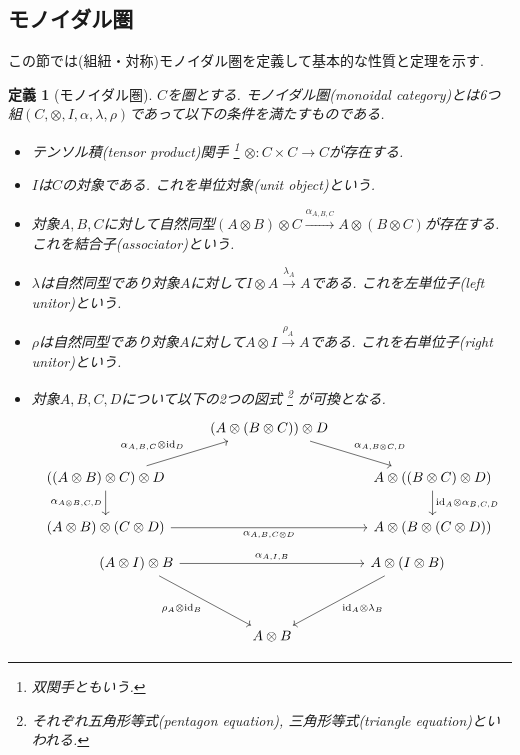 \documentclass[a4paper,12pt]{ltjsarticle}
\theoremstyle{break}
\newtheorem{defn}[thm]{定義}
\newcommand{\xr}[1]{\xrightarrow{#1}}
\newcommand{\id}{\mathrm{id}}
\newcommand{\al}{\alpha}
\newcommand{\la}{\lambda}
\newcommand{\ot}{\otimes}
\newcommand{\ti}{\times}
\numberwithin{equation}{section}
\begin{document}
\subsection{モノイダル圏}
この節では(組紐・対称)モノイダル圏を定義して基本的な性質と定理を示す. 

\begin{defn}[モノイダル圏]
  $C$を圏とする. 
  モノイダル圏(monoidal category)とは6つ組$(C,\ot, I, \al, \la, \rho)$であって以下の条件を満たすものである. 
  \begin{itemize}
    \item テンソル積(tensor product)関手
    \footnote{
    双関手ともいう. 
    }
    $\ot: C \ti C \to C$が存在する. 
    \item $I$は$C$の対象である. これを単位対象(unit object)という. 
    \item 対象$A, B, C$に対して自然同型$(A \ot B) \ot C \xr{\al_{A,B,C}} A \ot (B \ot C)$が存在する. これを結合子(associator)という. 
    \item $\la$は自然同型であり対象$A$に対して$I \ot A \xr{\la_A} A$である. これを左単位子(left unitor)という. 
    \item $\rho$は自然同型であり対象$A$に対して$A \ot I \xr{\rho_A} A$である. これを右単位子(right unitor)という. 
    \item 対象$A, B, C, D$について以下の2つの図式
      \footnote{
      それぞれ五角形等式(pentagon equation), 三角形等式(triangle equation)といわれる. 
      }
      が可換となる. 
    \[\begin{tikzcd}
      & {(A \ot (B \ot C)) \ot D} \\
      {((A \ot B) \ot C) \ot D} && {A \ot ((B \ot C) \ot D)} \\
      {(A \ot B) \ot (C \ot D)} && {A \ot (B \ot (C \ot D))}
      \arrow["{\al_{A, B, C} \ot \id_D}", from=2-1, to=1-2]
      \arrow["{\al_{A \ot B, C, D}}"', from=2-1, to=3-1]
      \arrow["{\al_{A, B, C \ot D}}"', from=3-1, to=3-3]
      \arrow["{\al_{A, B \ot C, D}}", from=1-2, to=2-3]
      \arrow["{\id_A \ot \al_{B, C ,D}}", from=2-3, to=3-3]
    \end{tikzcd}\]
    \[\begin{tikzcd}
      {(A \ot I) \ot B} &&&& {A \ot (I \ot B)} \\
      \\
      && {A \ot B}
      \arrow["{\al_{A, I, B}}", from=1-1, to=1-5]
      \arrow["{\rho_A \ot \id_B}"', from=1-1, to=3-3]
      \arrow["{\id_A \ot \la_B}", from=1-5, to=3-3]
    \end{tikzcd}\]
  \end{itemize}
\end{defn}
\end{document}
